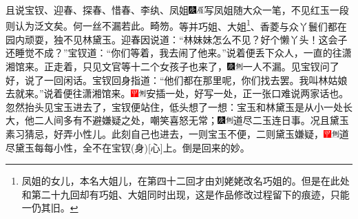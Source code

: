 且说宝钗、迎春、探春、惜春、李纨、凤姐{\includegraphics[width=3mm]{../Images/00004}\includegraphics[width=3mm]{../Images/00010}\footnotesize \kaishu 写凤姐随大众一笔，不见红玉一段则认为泛文矣。何一丝不漏若此。畸笏。}等并巧姐、大姐\footnote{凤姐的女儿，本名大姐儿，在第四十二回才由刘姥姥改名巧姐的。但是在此处和第二十九回却有巧姐、大姐同时出现，这是作品修改过程留下的痕迹，只能一仍其旧。}、香菱与众丫鬟们都在园内顽耍，独不见林黛玉。迎春因说道：“林妹妹怎么不见？好个懒丫头！这会子还睡觉不成？”宝钗道：“你们等着，我去闹了他来。”说着便丢下众人，一直的往潇湘馆来。正走着，只见文官等十二个女孩子也来了，{\includegraphics[width=3mm]{../Images/00004}\includegraphics[width=3mm]{../Images/00011}\footnotesize \kaishu 一人不漏。}见宝钗问了好，说了一回闲话。宝钗回身指道：“他们都在那里呢，你们找去罢。我叫林姑娘去就来。”说着便往潇湘馆来。{\includegraphics[width=3mm]{../Images/00002}\includegraphics[width=3mm]{../Images/00011}\footnotesize \kaishu 安插一处，好写一处，正一张口难说两家话也。}忽然抬头见宝玉进去了，宝钗便站住，低头想了一想：宝玉和林黛玉是从小一处长大，他二人间多有不避嫌疑之处，嘲笑喜怒无常；{\includegraphics[width=3mm]{../Images/00004}\includegraphics[width=3mm]{../Images/00011}\footnotesize \kaishu 道尽二玉连日事。}况且黛玉素习猜忌，好弄小性儿。此刻自己也进去，一则宝玉不便，二则黛玉嫌疑，{{\includegraphics[width=3mm]{../Images/00002}\includegraphics[width=3mm]{../Images/00011}\footnotesize \kaishu 道尽黛玉每每小性，全不在宝钗{(身)}{[}心{]}上。}}倒是回来的妙。

